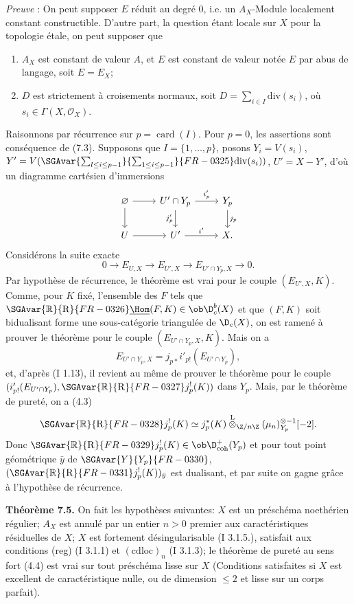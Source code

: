\emph{Preuve} : On peut supposer $E$ réduit au degré $0$, i.e. un $A_X$-Module localement constant constructible. D'autre part, la question étant locale sur $X$ pour la topologie étale, on peut supposer que
\begin{enumerate}[label=(\alph*)]
\item $A_X$ est constant de valeur $A$, et $E$ est constant de valeur notée $E$ par abus de langage, soit $E=E_X$;
\item $D$ est strictement à croisements normaux, soit $D=\sum_{i\in I}\mathrm{div}(s_i)$, où $s_i\in\Gamma(X,\mathcal{O}_X)$.
\end{enumerate}
Raisonnons par récurrence sur $p=\operatorname{card}(I)$. Pour $p=0$, les assertions sont conséquence de (7.3). Supposons que $I=\{1,\ldots,p\}$, posons $Y_i=V(s_i)$, $Y'=V(\SGAvar{\sum_{l\leq i\leq p-1}}{\sum_{1\leq i\leq p-1}}{FR-0325}\mathrm{div}(s_i))$, $U'=X-Y'$, d'où un diagramme cartésien d'immersions
\[
\begin{tikzcd}
\varnothing \arrow[r] \arrow[d] & U'\cap Y_p \arrow[r,"i'_p"] \arrow[d,"j'_p"'] & Y_p \arrow[d,"j_p"]\\
U \arrow[r] & U' \arrow[r,"i'"] & X.
\end{tikzcd}
\]
Considérons la suite exacte
\[
        0\longrightarrow E_{U,X}\longrightarrow E_{U',X}\longrightarrow E_{U'\cap Y_p,X}\longrightarrow0.
\]
Par hypothèse de
récurrence, le théorème est vrai pour le couple $(E_{U',X},K)$. Comme, pour $K$ fixé, l'ensemble des $F$ tels que $\SGAvar{\mathbb{R}}{\mathrm{R}}{FR-0326}\underline{\Hom}(F,K)\in\ob\D_c^b(X)$ et que $(F,K)$ soit bidualisant forme une sous-catégorie triangulée de $\D_c(X)$, on est ramené à prouver le théorème pour le couple $(E_{U'\cap Y_p,X},K)$. Mais on a
\[
        E_{U'\cap Y_p,X}=j_{p*}i'_{p!}(E_{U'\cap Y_p}),
\]
et, d'après (I 1.13), il revient au même de prouver le théorème pour le couple $(i'_{p!}(E_{U'\cap Y_p}),\SGAvar{\mathbb{R}}{\mathrm{R}}{FR-0327} j_p^!(K))$ dans $Y_p$. Mais, par le théorème de pureté, on a (4.3)
\[
        \SGAvar{\mathbb{R}}{\mathrm{R}}{FR-0328} j_p^!(K)\simeq j_p^*(K)\overset{\mathrm{L}}{\otimes}_{\Z/n\Z}(\mu_n)_{Y_p}^{\otimes -1}[-2].
\]
Donc $\SGAvar{\mathbb{R}}{\mathrm{R}}{FR-0329} j_p^!(K)\in\ob\D^{+}_{\mathrm{coh}}(Y_p)$ et pour tout point géométrique $\bar{y}$ de $\SGAvar{Y}{Y_p}{FR-0330}$, $(\SGAvar{\mathbb{R}}{\mathrm{R}}{FR-0331} j_p^!(K))_{\bar{y}}$ est dualisant, et par suite on gagne grâce à l'hypothèse de récurrence.

\textbf{Théorème 7.5.} On fait les hypothèses suivantes: $X$ est un préschéma noethérien régulier; $A_X$ est annulé par un entier $n>0$ premier aux caractéristiques résiduelles de $X$; $X$ est fortement désingularisable (I 3.1.5.), satisfait aux conditions (reg) (I 3.1.1) et $(\mathrm{cdloc})_n$ (I 3.1.3); le théorème de pureté au sens fort (4.4) est vrai sur tout préschéma lisse sur $X$ (Conditions satisfaites si $X$ est excellent de caractéristique nulle, ou de dimension $\leq2$ et lisse sur un corps parfait).

